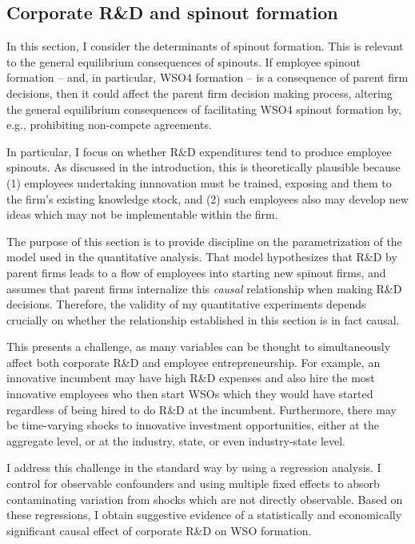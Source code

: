 \documentclass[11pt,english]{article}
\begin{document}
\subsection{Corporate R\&D and spinout formation}\label{subsec:empirics:corpRDandspinouts}

In this section, I consider the determinants of spinout formation. This is relevant to the general equilibrium consequences of spinouts. If employee spinout formation -- and, in particular, WSO4 formation -- is a consequence of parent firm decisions, then it could affect the parent firm decision making process, altering the general equilibrium consequences of facilitating WSO4 spinout formation by, e.g., prohibiting non-compete agreements. 

In particular, I focus on whether R\&D expenditures tend to produce employee spinouts. As discussed in the introduction, this is theoretically plausible because (1) employees undertaking innnovation must be trained, exposing and them to the firm's existing knowledge stock, and (2) such employees also may develop new ideas which may not be implementable within the firm.  

The purpose of this section is to provide discipline on the parametrization of the model used in the quantitative analysis. That model hypothesizes that R\&D by parent firms leads to a flow of employees into starting new spinout firms, and assumes that parent firms internalize this \textit{causal} relationship when making R\&D decisions. Therefore, the validity of my quantitative experiments depends crucially on whether the relationship established in this section is in fact causal. 

This presents a challenge, as many variables can be thought to simultaneously affect both corporate R\&D and employee entrepreneurship. For example, an innovative incumbent may have high R\&D expenses and also hire the most innovative employees who then start WSOs which they would have started regardless of being hired to do R\&D at the incumbent. Furthermore, there may be time-varying shocks to innovative investment opportunities, either at the aggregate level, or at the industry, state, or even industry-state level. 

I address this challenge in the standard way by using a regression analysis. I control for observable confounders and using multiple fixed effects to absorb contaminating variation from shocks which are not directly observable. Based on these regressions, I obtain suggestive evidence of a statistically and economically significant causal effect of corporate R\&D on WSO formation.
\end{document}
